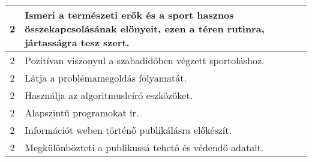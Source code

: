 \begin{longtable}{c | p{12cm} }
                                          2 &  Ismeri a természeti erők és a sport hasznos összekapcsolásának előnyeit, ezen a téren rutinra, jártasságra tesz szert. \\ \hline
                                          2 &  Pozitívan viszonyul a szabadidőben végzett sportoláshoz. \\ \hline
                                          2 &  Látja a problémamegoldás folyamatát. \\ \hline
                                          2 &  Használja az algoritmusleíró eszközöket. \\ \hline
                                          2 &  Alapszintű programokat ír. \\ \hline
                                          2 &  Információt weben történő publikálásra előkészít. \\ \hline
                                          2 &  Megkülönbözteti a publikussá tehető és védendő adatait. \\ \hline
                                      

\end{longtable}
